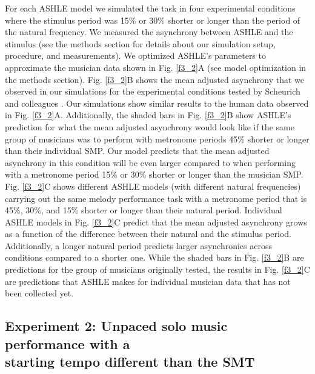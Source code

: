 \documentclass{report}
\begin{document}
For each ASHLE model we simulated the task in four experimental conditions where the stimulus period was 15\% or 30\% shorter or longer than the period of the natural frequency. We measured the asynchrony between ASHLE and the stimulus (see the methods section for details about our simulation setup, procedure, and measurements). We optimized ASHLE's parameters to approximate the musician data shown in Fig.{} \ref{f3_2}A (see model optimization in the methods section). Fig.{} \ref{f3_2}B shows the mean adjusted asynchrony that we observed in our simulations for the experimental conditions tested by Scheurich and colleagues \cite{scheurich2018tapping}. Our simulations show similar results to the human data observed in Fig.{} \ref{f3_2}A. Additionally, the shaded bars in Fig.{} \ref{f3_2}B show ASHLE's prediction for what the mean adjusted asynchrony would look like if the same group of musicians was to perform with metronome periods 45\% shorter or longer than their individual SMP. Our model predicts that the mean adjusted asynchrony in this condition will be even larger compared to when performing with a metronome period 15\% or 30\% shorter or longer than the musician SMP. Fig.{} \ref{f3_2}C shows different ASHLE models (with different natural frequencies) carrying out the same melody performance task with a metronome period that is 45\%, 30\%, and 15\% shorter or longer than their natural period. Individual ASHLE models in Fig.{} \ref{f3_2}C predict that the mean adjusted asynchrony grows as a function of the difference between their natural and the stimulus period. Additionally, a longer natural period predicts larger asynchronies across conditions compared to a shorter one. While the shaded bars in Fig.{} \ref{f3_2}B are predictions for the group of musicians originally tested, the results in Fig.{} \ref{f3_2}C are predictions that ASHLE makes for individual musician data that has not been collected yet.

\subsection{Experiment 2: Unpaced solo music performance with a \\ starting tempo different than the SMT}
\end{document}
